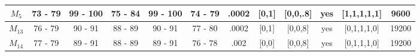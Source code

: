 \begin{table}[H]
{\begin{tabular}{|c|c|c|c|c|c|c|c|c|c|c|c|}
\rowcolor[HTML]{FFFFFF} 
$M_{5}$                                                                              & 73 - 79                                 & 99 - 100                                & 75 - 84                                 & 99 - 100                                & 74 - 79                                 & .0002                                                                                   & {[}0,1{]}                                                                                   & {[}0,0,.8{]}                                                                                & yes                                                                                       & {[}1,1,1,1,1{]}                                                                         & 9600                                                                                      \\ \hline
\rowcolor[HTML]{FFFFFF} 
$M_{13}$                                                                             & 76 - 79                                 & 90 - 91                                 & 88 - 89                                 & 90 - 91                                 & 77 - 80                                 & .0002                                                                                   & {[}0,1{]}                                                                                   & {[}0,0,8{]}                                                                                 & yes                                                                                       & {[}0,1,1,1,0{]}                                                                         & 19200                                                                                     \\ \hline
\rowcolor[HTML]{FFFFFF} 
$M_{14}$                                                                             & 77 - 79                                 & 89 - 91                                 & 88 - 89                                 & 89 - 91                                 & 76 - 78                                 & .002                                                                                    & {[}0,0{]}                                                                                   & {[}0,0,8{]}                                                                                 & yes                                                                                       & {[}0,1,1,1,0{]}                                                                         & 19200                                                                                     \\ \hline

\end{tabular}}
\end{table}

